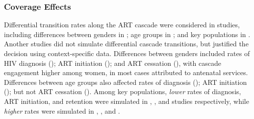 \subsubsection{Coverage Effects} %
\label{sss:res:cov}
Differential transition rates along the ART cascade were considered in
 studies, including differences between
genders in ;
age groups in ; and
key populations in .
Another  studies did not simulate differential cascade transitions,
but justified the decision using context-specific data.
Differences between genders included rates of
HIV diagnosis ();
ART initiation (); and
ART cessation (),
with cascade engagement higher among women,
in most cases attributed to antenatal services.
Differences between age groups also affected
rates of diagnosis ();
ART initiation ();
but not ART cessation (). %
Among key populations, \emph{lower} rates of
diagnosis, ART initiation, and retention were simulated in
, , and 
studies respectively, while \emph{higher} rates were simulated in
, , and .
